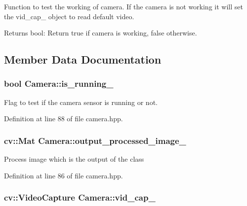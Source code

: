 Function to test the working of camera. If the camera is not working it will set the vid\+\_\+cap\+\_\+ object to read default video. 

\begin{DoxyReturn}{Returns}
bool\+: Return true if camera is working, false otherwise. 
\end{DoxyReturn}


\subsection{Member Data Documentation}
\subsubsection[{\texorpdfstring{is\+\_\+running\+\_\+}{is_running_}}]{\setlength{\rightskip}{0pt plus 5cm}bool Camera\+::is\+\_\+running\+\_\+\hspace{0.3cm}{\ttfamily [private]}}\hypertarget{class_camera_a24d141601f7d0330b77b86505851bd0d}{}\label{class_camera_a24d141601f7d0330b77b86505851bd0d}


Flag to test if the camera sensor is running or not. 



Definition at line 88 of file camera.\+hpp.

\subsubsection[{\texorpdfstring{output\+\_\+processed\+\_\+image\+\_\+}{output_processed_image_}}]{\setlength{\rightskip}{0pt plus 5cm}cv\+::\+Mat Camera\+::output\+\_\+processed\+\_\+image\+\_\+\hspace{0.3cm}{\ttfamily [private]}}\hypertarget{class_camera_ae96ea8feb337852401830c24af293025}{}\label{class_camera_ae96ea8feb337852401830c24af293025}
Process image which is the output of the class 

Definition at line 86 of file camera.\+hpp.

\subsubsection[{\texorpdfstring{vid\+\_\+cap\+\_\+}{vid_cap_}}]{\setlength{\rightskip}{0pt plus 5cm}cv\+::\+Video\+Capture Camera\+::vid\+\_\+cap\+\_\+\hspace{0.3cm}{\ttfamily [private]}}\hypertarget{class_camera_a264c7dfa5dd39176aedbb742f34ba1eb}{}\label{class_camera_a264c7dfa5dd39176aedbb742f34ba1eb}


